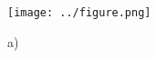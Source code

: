 
\question[] 


\begin{center}
  \texttt{[image: ../figure.png]}
\end{center}

\begin{solution}
  a) 
  \begin{align*}
  \end{align*}

\end{solution}
